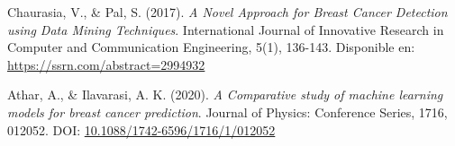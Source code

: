 \documentclass[12pt]{src/formato_utem}
\begin{document}
\newpage
\begin{thebibliography}{9}

Chaurasia, V., \& Pal, S. (2017).
\textit{A Novel Approach for Breast Cancer Detection using Data Mining Techniques}.
International Journal of Innovative Research in Computer and Communication Engineering, 5(1), 136-143.
Disponible en: \url{https://ssrn.com/abstract=2994932}

Athar, A., \& Ilavarasi, A. K. (2020).
\textit{A Comparative study of machine learning models for breast cancer prediction}.
Journal of Physics: Conference Series, 1716, 012052.
DOI: \href{https://doi.org/10.1088/1742-6596/1716/1/012052}{10.1088/1742-6596/1716/1/012052}

\end{thebibliography}
\end{document}

